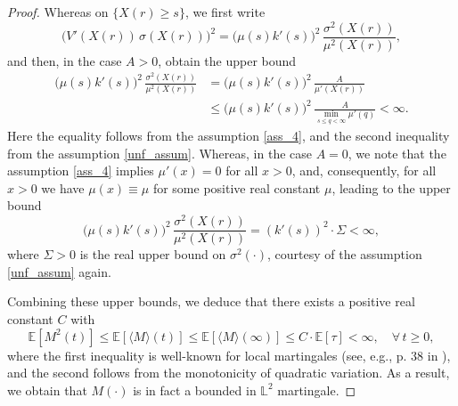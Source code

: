\documentclass[11pt,tbtags,reqno]{article}
\theoremstyle{definition}
\numberwithin{equation}{section}
\theoremstyle{definition}
\newcommand{\ex}{\mathbb{E}}
\begin{document}
\begin{proof}
Whereas on $\{X(r) \ge s\}$, we first write 
\begin{equation}
    \Big(V'(X(r))\, \sigma(X(r))\Big)^2 =
        \big(\mu(s) k'(s)\big)^2 \, \frac{\sigma^2(X(r))}{\mu^2(X(r))},
\end{equation}
and then, in the case $A > 0$, obtain the upper bound
\begin{equation}\label{second_upper_bound_a}
    \begin{split}
        \big(\mu(s) k'(s)\big)^2 \, \frac{\sigma^2(X(r))}{\mu^2(X(r))} 
        &= 
        \big(\mu(s) k'(s)\big)^2 \, \frac{A}{\mu'(X(r))}
        \\ &\le
        \big(\mu(s) k'(s)\big)^2 \, \frac{A}{\min\limits_{s \le q < \infty} \mu'(q)} < \infty.
    \end{split}
\end{equation}
Here the equality follows from the assumption \ref{ass_4}, and the second inequality from the assumption \ref{unf_assum}. Whereas, in the case $A = 0$, we note that the assumption \ref{ass_4} implies $\mu'(x) = 0$ for all $x > 0$, and, consequently, for all $x > 0$ we have $\mu(x) \equiv \mu$ for some positive real constant $\mu$, leading to the upper bound
\begin{equation}\label{second_upper_bound_b}
     \big(\mu(s) k'(s)\big)^2 \, \frac{\sigma^2(X(r))}{\mu^2(X(r))}
     = (k'(s))^2 \cdot \Sigma < \infty,
\end{equation}
where $\Sigma > 0$ is the real upper bound on $\sigma^2(\cdot)$, courtesy of the assumption \ref{unf_assum} again.

Combining these upper bounds, we deduce that there exists a positive real constant $C$ with
\begin{equation}
    \ex [M^2(t)] \le \ex [\langle M \rangle(t)] \le \mathbb{E}[\langle M \rangle(\infty)] \le C \cdot \ex [\tau] < \infty, \quad \forall \, t \ge 0,
\end{equation}
where the first inequality is well-known for local martingales (see, e.g., p. 38 in \cite{BMSC}), and the second follows from the monotonicity of quadratic variation. As a result, we obtain that $M(\cdot)$ is in fact a bounded in $\mathbb{L}^2$ martingale.


\end{proof}
\end{document}
